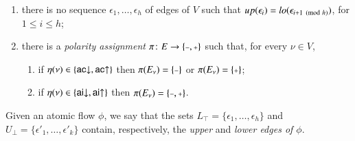 \begin{definition}
\begin{enumerate}
\item\label{ItAcycl} there is no sequence $\epsilon_1,\dots,\epsilon_h$ of edges of $V$ such that ${\mathit up}(\epsilon_i)={\mathit lo}(\epsilon_{i+1\pmod h})$, for $1\le i\le h$;
\item\label{ItPol} there is a \emph{polarity assignment} $\pi\colon E\to\{\pmi,\ppl\}$ such that, for every $\nu\in V$,
\begin{enumerate}
\item if $\eta(\nu)\in\{\mathsf{ac}{\downarrow},\mathsf{ac}{\uparrow}\}$ then $\pi(E_\nu)=\{\pmi\}$ or $\pi(E_\nu)=\{\ppl\}$;
\item if $\eta(\nu)\in\{\mathsf{ai}{\downarrow},\mathsf{ai}{\uparrow}\}$ then $\pi(E_\nu)=\{\pmi,\ppl\}$.
\end{enumerate}
\end{enumerate}
Given an atomic flow $\phi$, we say that the sets $L_\top=\{\epsilon_1,\dots,\epsilon_h\}$ and $U_\bot=\{\epsilon'_1,\dots,\epsilon'_k\}$ contain, respectively, the \emph{upper} and \emph{lower edges of $\phi$}.
\end{definition}


\newcommand{\one  }{{\mathchoice{\scriptstyle\mathbf1}
                                {\scriptstyle\mathbf1}
                                {\scriptstyle\mathbf1}
                                {\scriptscriptstyle\mathbf1}}}
\newcommand{\two  }{{\mathchoice{\scriptstyle\mathbf2}
                                {\scriptstyle\mathbf2}
                                {\scriptstyle\mathbf2}
                                {\scriptscriptstyle\mathbf2}}}
\newcommand{\three}{{\mathchoice{\scriptstyle\mathbf3}
                                {\scriptstyle\mathbf3}
                                {\scriptstyle\mathbf3}
                                {\scriptscriptstyle\mathbf3}}}
\newcommand{\four }{{\mathchoice{\scriptstyle\mathbf4}
                                {\scriptstyle\mathbf4}
                                {\scriptstyle\mathbf4}
                                {\scriptscriptstyle\mathbf4}}}
\newcommand{\five }{{\mathchoice{\scriptstyle\mathbf5}
                                {\scriptstyle\mathbf5}
                                {\scriptstyle\mathbf5}
                                {\scriptscriptstyle\mathbf5}}}
\newcommand{\six  }{{\mathchoice{\scriptstyle\mathbf6}
                                {\scriptstyle\mathbf6}
                                {\scriptstyle\mathbf6}
                                {\scriptscriptstyle\mathbf6}}}
\newcommand{\seven}{{\mathchoice{\scriptstyle\mathbf7}
                                {\scriptstyle\mathbf7}
                                {\scriptstyle\mathbf7}
                                {\scriptscriptstyle\mathbf7}}}
\newcommand{\eight}{{\mathchoice{\scriptstyle\mathbf8}
                                {\scriptstyle\mathbf8}
                                {\scriptstyle\mathbf8}
                                {\scriptscriptstyle\mathbf8}}}
\newcommand{\nine }{{\mathchoice{\scriptstyle\mathbf9}
                                {\scriptstyle\mathbf9}
                                {\scriptstyle\mathbf9}
                                {\scriptscriptstyle\mathbf9}}}

